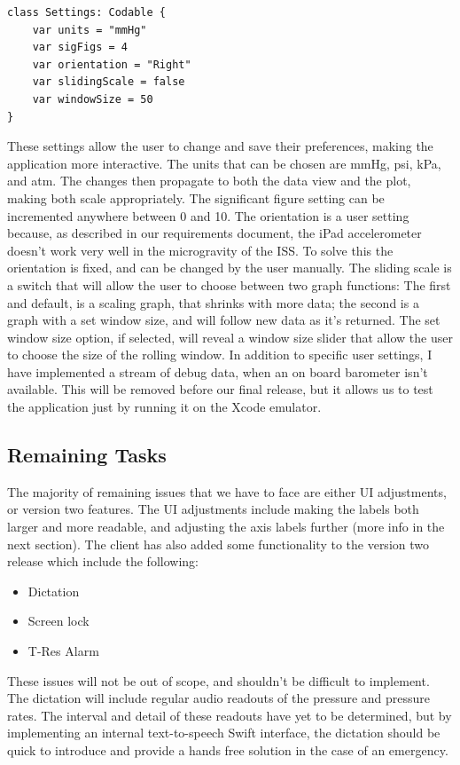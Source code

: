 \documentclass[onecolumn, draftclsnofoot,10pt, compsoc]{IEEEtran}
\begin{document}
\begin{lstlisting}
class Settings: Codable {
    var units = "mmHg"
    var sigFigs = 4
    var orientation = "Right"
    var slidingScale = false
    var windowSize = 50
}
\end{lstlisting}

These settings allow the user to change and save their preferences, making the application more interactive.
The units that can be chosen are mmHg, psi, kPa, and atm.
The changes then propagate to both the data view and the plot, making both scale appropriately.
The significant figure setting can be incremented anywhere between 0 and 10.
The orientation is a user setting because, as described in our requirements document, the iPad accelerometer doesn't work very well in the microgravity of the ISS.
To solve this the orientation is fixed, and can be changed by the user manually.
The sliding scale is a switch that will allow the user to choose between two graph functions: The first and default, is a scaling graph, that shrinks with more data; the second is a graph with a set window size, and will follow new data as it's returned.
The set window size option, if selected, will reveal a window size slider that allow the user to choose the size of the rolling window.
In addition to specific user settings, I have implemented a stream of debug data, when an on board barometer isn't available.
This will be removed before our final release, but it allows us to test the application just by running it on the Xcode emulator.

\subsection{Remaining Tasks}
The majority of remaining issues that we have to face are either UI adjustments, or version two features.
The UI adjustments include making the labels both larger and more readable, and adjusting the axis labels further (more info in the next section).
The client has also added some functionality to the version two release which include the following:

\begin{itemize}
  \item Dictation
  \item Screen lock
  \item T-Res Alarm
\end{itemize}

These issues will not be out of scope, and shouldn't be difficult to implement.
The dictation will include regular audio readouts of the pressure and pressure rates.
The interval and detail of these readouts have yet to be determined, but by implementing an internal text-to-speech Swift interface, the dictation should be quick to introduce and provide a hands free solution in the case of an emergency.
\end{document}
